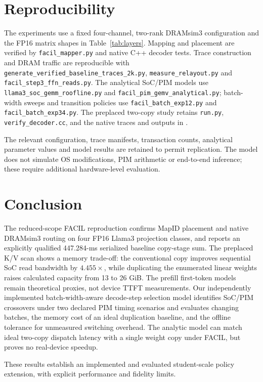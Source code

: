 \documentclass[conference,10pt]{IEEEtran}
\begin{document}
\section{Reproducibility}
The experiments use a fixed four-channel, two-rank DRAMsim3
configuration and the FP16 matrix shapes in Table~\ref{tab:layers}.
Mapping and placement are verified by \texttt{facil\_mapper.py}
and native C++ decoder tests. Trace construction and DRAM traffic
are reproducible with
\texttt{generate\_verified\_baseline\_traces\_2k.py},
\texttt{measure\_relayout.py} and
\texttt{facil\_step3\_ffn\_reads.py}. The analytical SoC/PIM
models use \texttt{llama3\_soc\_gemm\_roofline.py} and
\texttt{facil\_pim\_gemv\_analytical.py}; batch-width sweeps and
transition policies use \texttt{facil\_batch\_exp12.py} and
\texttt{facil\_batch\_exp34.py}. The preplaced two-copy study
retains \texttt{run.py}, \texttt{verify\_decoder.cc}, and the
native traces and outputs in
.

The relevant configuration, trace manifests, transaction counts,
analytical parameter values and model results are retained to
permit replication. The model does not simulate OS modifications,
PIM arithmetic or end-to-end inference; these require additional
hardware-level evaluation.

\section{Conclusion}
The reduced-scope FACIL reproduction confirms MapID placement and
native DRAMsim3 routing on four FP16 Llama3 projection classes,
and reports an explicitly qualified 447.284-ms serialized baseline
copy-stage sum. The preplaced K/V scan shows a memory trade-off:
the conventional copy improves sequential SoC read bandwidth by
$4.455\times$, while duplicating the enumerated linear weights
raises calculated capacity from 13 to 26 GiB. The prefill first-token models remain theoretical
proxies, not device TTFT measurements. Our independently implemented
batch-width-aware decode-step selection model identifies SoC/PIM
crossovers under two declared PIM timing scenarios and evaluates
changing batches, the memory cost of an ideal duplication baseline,
and the offline tolerance for unmeasured switching overhead. The
analytic model can match ideal two-copy dispatch latency with a
single weight copy under FACIL, but proves no real-device speedup.

These results establish an implemented and evaluated student-scale
policy extension, with explicit performance and fidelity limits.
\end{document}
